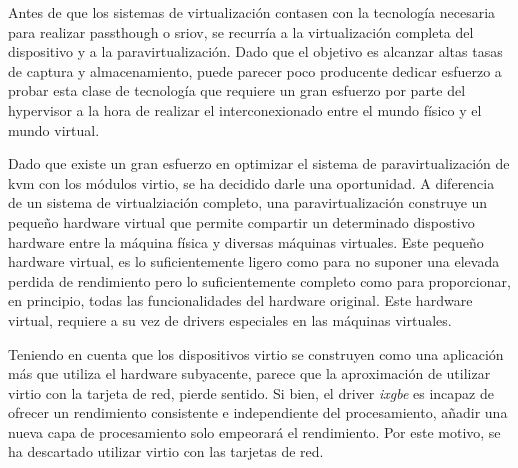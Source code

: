 Antes de que los sistemas de virtualización contasen con la tecnología necesaria para realizar \gls{passthough} o \gls{sriov}, se recurría a la virtualización completa del dispositivo y a la paravirtualización. Dado que el objetivo es alcanzar altas tasas de captura y almacenamiento, puede parecer poco producente dedicar esfuerzo a probar esta clase de tecnología que requiere un gran esfuerzo por parte del hypervisor a la hora de realizar el interconexionado entre el mundo físico y el mundo virtual.

Dado que existe un gran esfuerzo en optimizar el sistema de paravirtualización de \gls{kvm} con los módulos \gls{virtio}, se ha decidido darle una oportunidad. A diferencia de un sistema de virtualziación completo, una paravirtualización construye un pequeño hardware virtual que permite compartir un determinado dispostivo hardware entre la máquina física y diversas máquinas virtuales. Este pequeño hardware virtual, es lo suficientemente ligero como para no suponer una elevada perdida de rendimiento pero lo suficientemente completo como para proporcionar, en principio, todas las funcionalidades del hardware original. Este hardware virtual, requiere a su vez de drivers especiales en las máquinas virtuales.

Teniendo en cuenta que los dispositivos \gls{virtio} se construyen como una aplicación más que utiliza el hardware subyacente, parece que la aproximación de utilizar \gls{virtio} con la tarjeta de red, pierde sentido. Si bien, el driver \textit{ixgbe} es incapaz de ofrecer un rendimiento consistente e independiente del procesamiento, añadir una nueva capa de procesamiento solo empeorará el rendimiento. Por este motivo, se ha descartado utilizar \gls{virtio} con las tarjetas de red.

